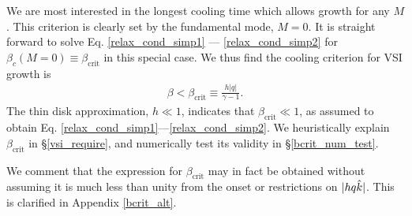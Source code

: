 
We are most interested in the longest cooling time which allows growth for any $M$.  
This criterion is clearly set by the fundamental mode, $M = 0$. It is straight
forward to solve Eq. \ref{relax_cond_simp1} --- \ref{relax_cond_simp2}
for $\beta_c(M=0)  \equiv \beta_\mathrm{crit}$ in this special case. We thus find the cooling criterion for  
VSI growth is  
 \begin{align}\label{iso_vsi_cond}
   \beta <   \beta_\mathrm{crit}  \equiv
   \frac{h|q|}{\gamma-1} . 
 \end{align}
 The thin disk approximation, $h \ll 1$, indicates that $\beta_\mathrm{crit} \ll
 1$, as assumed to obtain Eq. \ref{relax_cond_simp1}---\ref{relax_cond_simp2}. 
 We heuristically explain $\beta_\mathrm{crit}$ in \S\ref{vsi_require}, and numerically
 test its validity in \S\ref{bcrit_num_test}.  
 
We comment that the expression for $\beta_\mathrm{crit}$ may in fact 
be obtained without assuming it is much less than unity from the onset or 
restrictions on $| h q \hat{k}|$.  This is clarified in Appendix
\ref{bcrit_alt}.  
 




